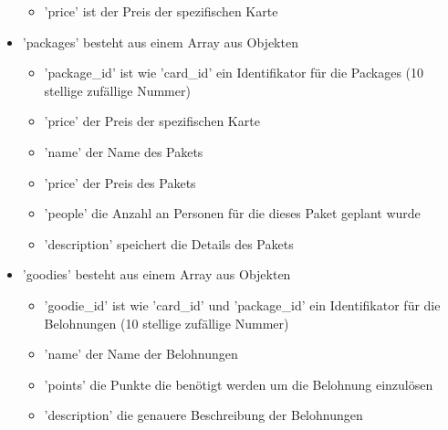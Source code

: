 \begin{itemize}
\begin{itemize}
						\item 'price' ist der Preis der spezifischen Karte
					\end{itemize}
					\item 'packages' besteht aus einem Array aus Objekten
					\begin{itemize}
						\item 'package\_id' ist wie 'card\_id' ein Identifikator für die Packages (10 stellige zufällige Nummer)
						\item 'price' der Preis der spezifischen Karte
						\item 'name' der Name des Pakets
						\item 'price' der Preis des Pakets
						\item 'people' die Anzahl an Personen für die dieses Paket geplant wurde
						\item 'description' speichert die Details des Pakets
					\end{itemize}
					\item 'goodies' besteht aus einem Array aus Objekten
					\begin{itemize}
						\item 'goodie\_id' ist wie 'card\_id' und 'package\_id' ein Identifikator für die Belohnungen (10 stellige zufällige Nummer)
						\item 'name' der Name der Belohnungen
						\item 'points' die Punkte die benötigt werden um die Belohnung einzulösen
						\item 'description' die genauere Beschreibung der Belohnungen
					\end{itemize}				
				\end{itemize}
		
			\newpage
			
